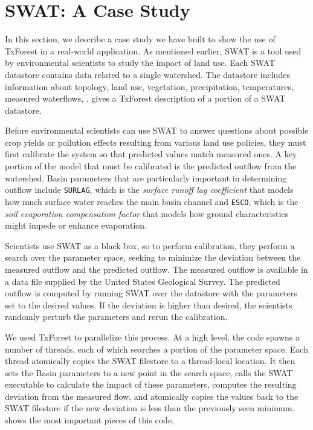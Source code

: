 \section{SWAT: A Case Study}
\label{sec:swat}
In this section, we describe a case study we have built to show the
use of TxForest in a real-world application.  As mentioned earlier,
SWAT is a tool used by environmental scientists to study the impact of
land use.  Each SWAT datastore contains data related to a single
watershed.  The datastore includes information about topology, land
use, vegetation, precipitation, temperatures, measured waterflows,
\etc{}.   gives a TxForest description of
a portion of a SWAT datastore.  

Before environmental scientists can use SWAT to answer questions about
possible crop yields or pollution effects resulting from various land
use policies, they must first calibrate the system so that predicted
values match measured ones.  A key portion of the model that must be
calibrated is the predicted outflow from the watershed.  Basin
parameters that are particularly important in determining outflow
include \texttt{SURLAG}, which is the 
 \textit{surface runoff lag coefficient} that models how much surface
 water reaches the main basin channel 
and \texttt{ESCO}, which is the 
 \textit{soil evaporation compensation factor} that models how ground
 characteristics might impede or enhance evaporation.

Scientists use SWAT as a black box, so to perform calibration, they
perform a search over the parameter space, seeking to minimize the
deviation between the measured outflow and the predicted outflow.
The measured outflow is available in a data file supplied by the
United States Geological Survey.  The predicted outflow is computed by
running SWAT over the datastore with the parameters set to the desired
values.  If the deviation is higher than desired, the scientists
randomly perturb the parameters and rerun the calibration.  

We used TxForest to parallelize this process.  At a high level, the
code spawns a number of threads, each of which searches a portion of
the parameter space.  Each thread atomically copies the SWAT filestore
to a thread-local location.  It then sets the Basin parameters to a
new point in the search space, calls the SWAT executable to calculate
the impact of these parameters, computes the resulting deviation from
the measured flow, and atomically copies the values back to the SWAT
filestore if the new deviation is less than the previously seen
minimum.  shows the most important pieces of
this code. 

